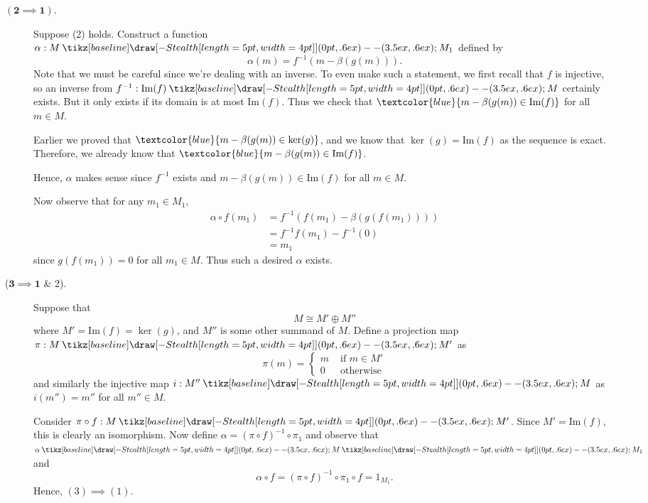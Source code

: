 \documentclass[12pt,letterpaper]{algebra_book}
\renewcommand{\to}{\mathbin{\tikz[baseline] \draw[-{Stealth[length=5pt,width=4pt]}] (0pt,.6ex) -- (3.5ex,.6ex);}}
\newcommand{\im}{\mbox{Im}}
\theoremstyle{definition}
\begin{document}
\begin{prf}
\begin{description}
        \item[$\bm{(2 \implies 1)}$.] Suppose (2) holds. Construct
        a function $\alpha : M \to M_1$ defined by 
        \[
            \alpha(m) = f^{-1}(m - \beta (g(m))).
        \]
        Note that we must be careful since we're dealing with an
        inverse. To even make such a statement, we first recall
        that $f$ is injective, so an inverse from $f^{-1}: \im(f) \to M$
        certainly exists. But it only exists if its domain is at
        most $\im(f)$. Thus we check that $\textcolor{blue}{m - \beta(g(m)) \in
        \im(f)}$ for all $m \in M$.
        
        Earlier we proved that $\textcolor{blue}{m -
        \beta(g(m)) \in \ker(g)}$, and we know that $\ker(g) =
        \im(f)$ as the sequence is exact.
        Therefore, we already know that $\textcolor{blue}{m -
        \beta(g(m)) \in \im(f)}$.

        Hence, $\alpha$ makes sense
        since $f^{-1}$ exists and $m - \beta(g(m)) \in \im(f)$ for
        all $m \in M$.


        Now observe that for any $m_1 \in M_1$, 
        \begin{align*}
            \alpha \circ f(m_1) &= f^{-1}(f(m_1) - \beta(g(f(m_1))))\\
            &= f^{-1}f(m_1) - f^{-1}(0)\\
            &= m_1
        \end{align*}
        since $g(f(m_1)) = 0$ for all $m_1 \in M$. Thus such a
        desired $\alpha$ exists.

        \item[($\bm{3 \implies 1}$ \& 2).]
        Suppose that 
        \[
            M \cong M'\oplus M''
        \] 
        where $M' = \im(f) = \ker(g)$, and $M''$ is some other
        summand of $M$. Define a projection map $\pi: M \to M'$ as
        \[
            \pi(m) =
            \begin{cases}
                m & \text{ if } m \in M'\\
                0 & \text{ otherwise}
            \end{cases}
        \]
        and similarly the injective map $i: M'' \to M$ as $i(m'')
        = m''$ for all $m'' \in M$. 
        
        Consider $\pi \circ f: M \to M'$. Since $M' = \im(f)$,
        this is clearly an isomorphism. Now define $\alpha = (\pi
        \circ f)^{-1} \circ \pi_1$ and observe that $\alpha
        \to M \to M_1$ and 
        \[
            \alpha \circ f = (\pi \circ f)^{-1} \circ \pi_1 \circ f = 1_{M_1}.
        \]
        Hence, $(3) \implies (1)$.
        

\end{description}
\end{prf}
\end{document}
